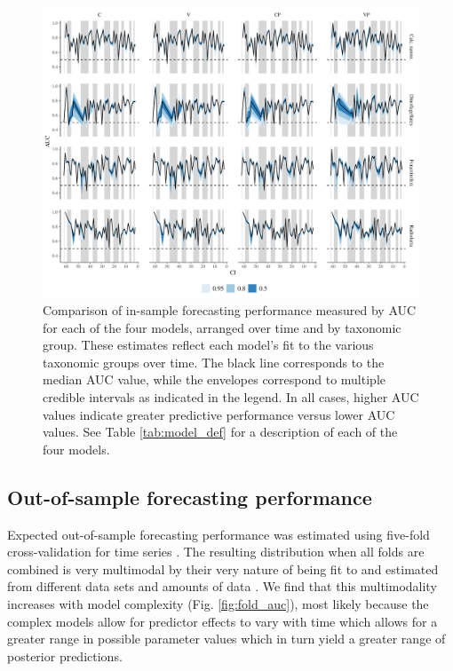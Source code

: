 \documentclass[12pt,letterpaper]{article}
\begin{document}
\begin{refsection}
\begin{figure}[ht]
 \centering
 \includegraphics[width=\textwidth,height=0.5\textheight,keepaspectratio=true]{../results/figure/auc_taxon_time_full}
 \caption{Comparison of in-sample forecasting performance measured by AUC for each of the four models, arranged over time and by taxonomic group. These estimates reflect each model's fit to the various taxonomic groups over time. The black line corresponds to the median AUC value, while the envelopes correspond to multiple credible intervals as indicated in the legend. In all cases, higher AUC values indicate greater predictive performance versus lower AUC values. See Table \ref{tab:model_def} for a description of each of the four models.}
 \label{fig:auc_taxon_time}
\end{figure}




\subsection{Out-of-sample forecasting performance}

Expected out-of-sample forecasting performance was estimated using five-fold cross-validation for time series \citep{Arlot2010,Bergmeir2016}. The resulting distribution when all folds are combined is very multimodal by their very nature of being fit to and estimated from different data sets and amounts of data \citep{ESL}. We find that this multimodality increases with model complexity (Fig. \ref{fig:fold_auc}), most likely because the complex models allow for predictor effects to vary with time which allows for a greater range in possible parameter values which in turn yield a greater range of posterior predictions.


\end{refsection}
\end{document}
